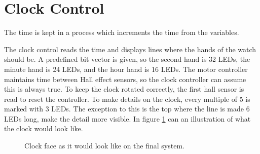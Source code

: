 \section{Clock Control}
The time is kept in a process which increments the time from the variables.

The clock control reads the time and displays lines where the hands of the watch should be.
A predefined bit vector is given, so the second hand is 32 LEDs, the minute hand is 24 LEDs, and the hour hand is 16 LEDs.
The motor controller maintains time between Hall effect sensors, so the clock controller can assume this is always true.
To keep the clock rotated correctly, the first hall sensor is read to reset the controller.
To make details on the clock, every multiple of 5 is marked with 3 LEDs.
The exception to this is the top where the line is made 6 LEDs long, make the detail more visible.
In figure \ref{fig:clock_face} can an illustration of what the clock would look like.

\begin{figure}[h]
\centering
{}
 \caption{Clock face as it would look like on the final system.}
 \label{fig:clock_face}
\end{figure}